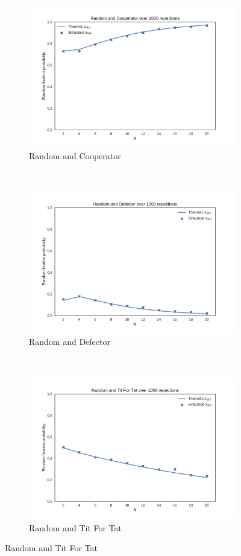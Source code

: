 \documentclass{article}
\begin{document}
\begin{figure}[!hbtp]
    \centering
    \begin{subfigure}[t]{.3\textwidth}
        \centering
        \includegraphics[width=.8\textwidth]{../img/Random_v_Cooperator.pdf}
        \caption{Random and Cooperator}
    \end{subfigure}%
    ~
    \begin{subfigure}[t]{.3\textwidth}
        \centering
        \includegraphics[width=.8\textwidth]{../img/Random_v_Defector.pdf}
        \caption{Random and Defector}
    \end{subfigure}%
    ~
    \begin{subfigure}[t]{.3\textwidth}
        \centering
        \includegraphics[width=.8\textwidth]{../img/Random_v_Tit_For_Tat.pdf}
        \caption{Random and Tit For Tat}
    \end{subfigure}%


\end{figure}
\end{document}
